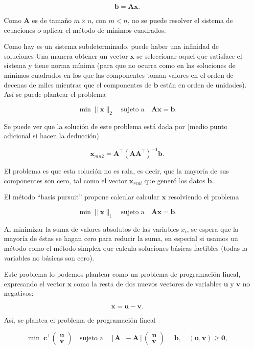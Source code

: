 \documentclass[11pt]{article}
\begin{document}
\[ \mathbf{b} = \mathbf{A} \mathbf{x}. \]

Como \(\mathbf{A}\) es de tamaño \(m \times n\), con \(m<n\), no se
puede resolver el sistema de ecuaciones o aplicar el método de mínimos
cuadrados.

Como hay es un sistema subdeterminado, puede haber una infinidad de
soluciones Una manera obtener un vector \(\mathbf{x}\) se seleccionar
aquel que satisface el sistema y tiene norma mínima (para que no ocurra
como en las soluciones de mínimos cuadrados en los que las componentes
toman valores en el orden de decenas de miles mientras que el
componentes de \(\mathbf{b}\) están en orden de unidades). Así se puede
plantear el problema

\[  \min \|\mathbf{x}\|_2 \quad \text{sujeto a} \quad \mathbf{A} \mathbf{x} = \mathbf{b}. \]

Se puede ver que la solución de este problema está dada por (medio punto
adicional si hacen la deducción)

\[ \mathbf{x}_{mn2} = \mathbf{A}^\top(\mathbf{A}\mathbf{A}^\top)^{-1} \mathbf{b}.\]

El problema es que esta solución no es rala, es decir, que la mayoría de
sus componentes son cero, tal como el vector \(\mathbf{x}_{real}\) que
generó los datos \(\mathbf{b}\).

El método ``basis pursuit'' propone calcular calcular \(\mathbf{x}\)
resolviendo el problema

\[  \min \|\mathbf{x}\|_1 \quad \text{sujeto a} \quad \mathbf{A} \mathbf{x} = \mathbf{b}. \]

Al minimizar la suma de valores absolutos de las variables \(x_i\), se
espera que la mayoría de éstas se hagan cero para reducir la suma, en
especial si usamos un método como el método simplex que calcula
soluciones básicas factibles (todas la variables no básicas son cero).

Este problema lo podemos plantear como un problema de programación
lineal, expresando el vector \(\mathbf{x}\) como la resta de dos nuevos
vectores de variables \(\mathbf{u}\) y \(\mathbf{v}\) no negativos:

\[ \mathbf{x} = \mathbf{u} - \mathbf{v}.\]

Así, se plantea el problema de programación lineal

\[  \min \; 
\mathbf{c}^\top 
\left(
\begin{array}{l}
\mathbf{u}  \\ \mathbf{v}
\end{array}
\right)
\quad \text{sujeto a} \quad 
[\mathbf{A}\;\; -\mathbf{A}] 
\left(
\begin{array}{l}
\mathbf{u}  \\ \mathbf{v}
\end{array}
\right)
= \mathbf{b}, \quad (\mathbf{u}, \mathbf{v}) \geq  \mathbf{0}, \]
\end{document}
